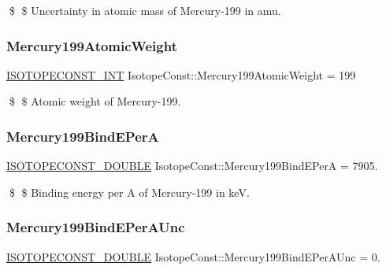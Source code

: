 \$ \$ Uncertainty in atomic mass of Mercury-\/199 in amu. \mbox{\label{group___isotope_const-_mercury-_hg199_ga977f43069eacd27078ec466fde7f65d3}} 
\subsubsection{\texorpdfstring{Mercury199\+Atomic\+Weight}{Mercury199AtomicWeight}}
{\footnotesize\ttfamily \mbox{\hyperlink{group___isotope_const-_macros_ga5f18360b3e99483a35c32d789e62621c}{I\+S\+O\+T\+O\+P\+E\+C\+O\+N\+S\+T\+\_\+\+I\+NT}} Isotope\+Const\+::\+Mercury199\+Atomic\+Weight = 199}

\$ \$ Atomic weight of Mercury-\/199. \mbox{\label{group___isotope_const-_mercury-_hg199_ga5e64ba3468569ad59a75091504d0dc2a}} 
\subsubsection{\texorpdfstring{Mercury199\+Bind\+E\+PerA}{Mercury199BindEPerA}}
{\footnotesize\ttfamily \mbox{\hyperlink{group___isotope_const-_macros_ga8f45a7272ce02c0b4c65c44636ed719a}{I\+S\+O\+T\+O\+P\+E\+C\+O\+N\+S\+T\+\_\+\+D\+O\+U\+B\+LE}} Isotope\+Const\+::\+Mercury199\+Bind\+E\+PerA = 7905.}

\$ \$ Binding energy per A of Mercury-\/199 in keV. \mbox{\label{group___isotope_const-_mercury-_hg199_ga14a4fd9447d845f8f78df2944f6aeeef}} 
\subsubsection{\texorpdfstring{Mercury199\+Bind\+E\+Per\+A\+Unc}{Mercury199BindEPerAUnc}}
{\footnotesize\ttfamily \mbox{\hyperlink{group___isotope_const-_macros_ga8f45a7272ce02c0b4c65c44636ed719a}{I\+S\+O\+T\+O\+P\+E\+C\+O\+N\+S\+T\+\_\+\+D\+O\+U\+B\+LE}} Isotope\+Const\+::\+Mercury199\+Bind\+E\+Per\+A\+Unc = 0.}

